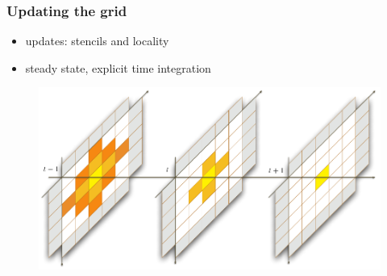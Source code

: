 \begin{frame}[fragile]
%
  \frametitle{Updating the grid}
%
  \begin{itemize}
%
  \item updates: stencils and locality
  \item steady state, explicit time integration
% 
  \end{itemize}
%
  \begin{figure}
    \includegraphics[scale=0.5]{figures/structured-updates.pdf}
  \end{figure} 
%
\end{frame}

